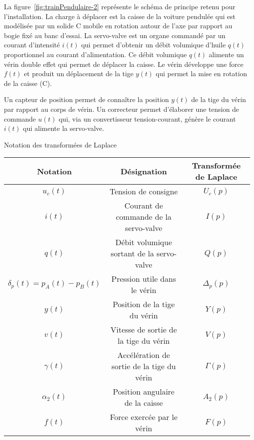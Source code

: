 \begin{Exo}[name={Devoir},title={Système de pendulation},origin={Adapté de Centrale MP 2000},label={exo:CentralePendulation}]
La figure~\ref{fig:trainPendulaire-2}   représente le schéma de principe retenu pour l’installation. La charge à déplacer est la caisse de la voiture pendulée qui est modélisée par un solide C mobile en rotation autour de l’axe   par rapport au bogie fixé au banc d’essai. La servo-valve est un organe commandé par un courant d’intensité $i(t)$   qui permet d’obtenir un débit volumique d’huile  $q(t)$  proportionnel au courant d’alimentation. Ce débit volumique  $q(t)$ alimente un vérin double effet qui permet de déplacer la caisse. Le vérin développe une force $f(t)$  et produit un déplacement de la tige $y(t)$  qui permet la mise en rotation de la caisse (C). 

Un capteur de position permet de connaître la position $y(t)$  de la tige du vérin par rapport au corps de vérin. Un correcteur permet d’élaborer une tension de commande $u(t)$  qui, via un convertisseur tension-courant, génère le courant $i(t)$ qui alimente la servo-valve.


Notation des transformées de Laplace

\begin{tabular}{|c|c|c|}\hline
Notation	& 	Désignation					&	Transformée de Laplace \\ \hline
$u_c(t)$	& Tension de consigne	 		&	$U_c(p)$ \\
 
$i(t)$ 		& Courant de commande de la servo-valve	 & $I(p)$ \\
 
$q(t)$ 		& Débit volumique sortant de la servo-valve	 & $Q(p)$ \\
 
$\delta_p(t)=p_A(t)-p_B(t)$
			& Pression utile dans le vérin	 & $\Delta_p(p)$ \\
 
$y(t)$		&Position de la tige du vérin	 	& $Y(p)$ \\
 
$v(t)$		& Vitesse de sortie de la tige du vérin	 & $V(p)$\\
 
$\gamma(t)$	&Accélération de sortie de la tige du vérin	 & $\Gamma(p)$ \\
 
$\alpha_2(t)$ & Position angulaire de la caisse	 		& $A_2(p)$ \\
 
$f(t)$			& Force exercée par le vérin					& $F(p)$\\ \hline
\end{tabular}


\end{Exo}
